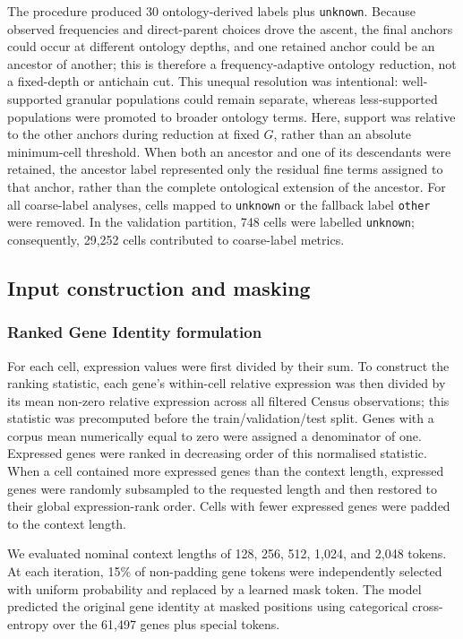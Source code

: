 \documentclass[pdflatex,sn-nature]{sn-jnl}%
\theoremstyle{thmstyleone}%
\theoremstyle{thmstyletwo}%
\theoremstyle{thmstylethree}%
\begin{document}
The procedure produced 30 ontology-derived labels plus \texttt{unknown}.
Because observed frequencies and direct-parent choices drove the ascent, the final anchors could occur at different ontology depths, and one retained anchor could be an ancestor of another; this is therefore a frequency-adaptive ontology reduction, not a fixed-depth or antichain cut.
This unequal resolution was intentional: well-supported granular populations could remain separate, whereas less-supported populations were promoted to broader ontology terms.
Here, support was relative to the other anchors during reduction at fixed \(G\), rather than an absolute minimum-cell threshold.
When both an ancestor and one of its descendants were retained, the ancestor label represented only the residual fine terms assigned to that anchor, rather than the complete ontological extension of the ancestor.
For all coarse-label analyses, cells mapped to \texttt{unknown} or the fallback label \texttt{other} were removed.
In the validation partition, 748 cells were labelled \texttt{unknown}; consequently, 29,252 cells contributed to coarse-label metrics.

\subsection{Input construction and masking}

\subsubsection{Ranked Gene Identity formulation}

For each cell, expression values were first divided by their sum.
To construct the ranking statistic, each gene's within-cell relative expression was then divided by its mean non-zero relative expression across all filtered Census observations; this statistic was precomputed before the train/validation/test split.
Genes with a corpus mean numerically equal to zero were assigned a denominator of one.
Expressed genes were ranked in decreasing order of this normalised statistic.
When a cell contained more expressed genes than the context length, expressed genes were randomly subsampled to the requested length and then restored to their global expression-rank order.
Cells with fewer expressed genes were padded to the context length.

We evaluated nominal context lengths of 128, 256, 512, 1,024, and 2,048 tokens.
At each iteration, 15\% of non-padding gene tokens were independently selected with uniform probability and replaced by a learned mask token.
The model predicted the original gene identity at masked positions using categorical cross-entropy over the 61,497 genes plus special tokens.
\end{document}

